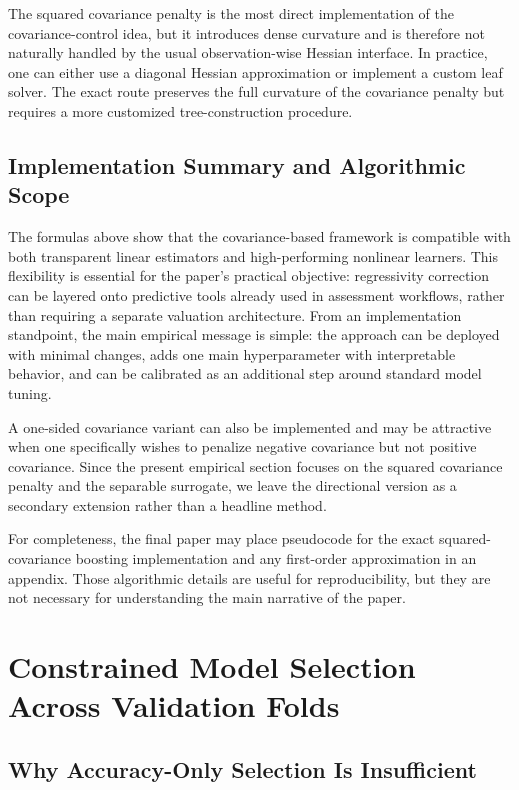 \documentclass[12pt]{article}
\theoremstyle{plain}
\theoremstyle{definition}
\begin{document}
The squared covariance penalty is the most direct implementation of the covariance-control idea, but it introduces dense curvature and is therefore not naturally handled by the usual observation-wise Hessian interface. In practice, one can either use a diagonal Hessian approximation or implement a custom leaf solver. The exact route preserves the full curvature of the covariance penalty but requires a more customized tree-construction procedure.

\subsection{Implementation Summary and Algorithmic Scope}

The formulas above show that the covariance-based framework is compatible with both transparent linear estimators and high-performing nonlinear learners. This flexibility is essential for the paper's practical objective: regressivity correction can be layered onto predictive tools already used in assessment workflows, rather than requiring a separate valuation architecture. From an implementation standpoint, the main empirical message is simple: the approach can be deployed with minimal changes, adds one main hyperparameter with interpretable behavior, and can be calibrated as an additional step around standard model tuning.

A one-sided covariance variant can also be implemented and may be attractive when one specifically wishes to penalize negative covariance but not positive covariance. Since the present empirical section focuses on the squared covariance penalty and the separable surrogate, we leave the directional version as a secondary extension rather than a headline method.

For completeness, the final paper may place pseudocode for the exact squared-covariance boosting implementation and any first-order approximation in an appendix. Those algorithmic details are useful for reproducibility, but they are not necessary for understanding the main narrative of the paper.

\section{Constrained Model Selection Across Validation Folds}
\label{sec:model_selection}

\subsection{Why Accuracy-Only Selection Is Insufficient}
\end{document}
